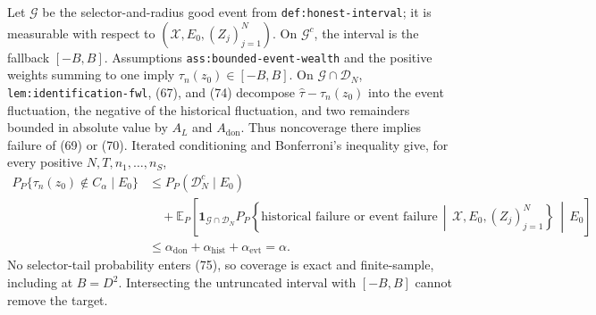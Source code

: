 Let \(\mathcal G\) be the selector-and-radius good event from
\texttt{def:honest-interval}; it is measurable with respect to
\((\mathscr X,E_0,(Z_j)_{j=1}^{N})\).  On \(\mathcal G^c\), the interval is
the fallback \([-B,B]\).  Assumptions \texttt{ass:bounded-event-wealth} and
the positive weights summing to one imply \(\tau_n(z_0)\in[-B,B]\).  On
\(\mathcal G\cap\mathcal D_N\), \texttt{lem:identification-fwl}, (67), and
(74) decompose \(\widehat\tau-\tau_n(z_0)\) into the event fluctuation, the
negative of the historical fluctuation, and two remainders bounded in
absolute value by \(A_L\) and \(A_{\mathrm{don}}\).  Thus noncoverage there
implies failure of (69) or (70).  Iterated conditioning and Bonferroni's
inequality give, for every positive \(N,T,n_1,\ldots,n_S\),
\[
\begin{aligned}
P_P\{\tau_n(z_0)\notin C_\alpha\mid E_0\}
&\le P_P(\mathcal D_N^c\mid E_0)\\
&\quad+
\mathbb E_P\!\left[
\mathbf 1_{\mathcal G\cap\mathcal D_N}
P_P\!\left\{
\text{historical failure or event failure}
\,\middle|\,\mathscr X,E_0,(Z_j)_{j=1}^{N}
\right\}
\,\middle|\,E_0\right]\\
&\le \alpha_{\mathrm{don}}+\alpha_{\mathrm{hist}}
+\alpha_{\mathrm{evt}}=\alpha.
\end{aligned}
\tag{75}
\]
No selector-tail probability enters (75), so coverage is exact and
finite-sample, including at \(B=D^2\).  Intersecting the untruncated interval
with \([-B,B]\) cannot remove the target.

